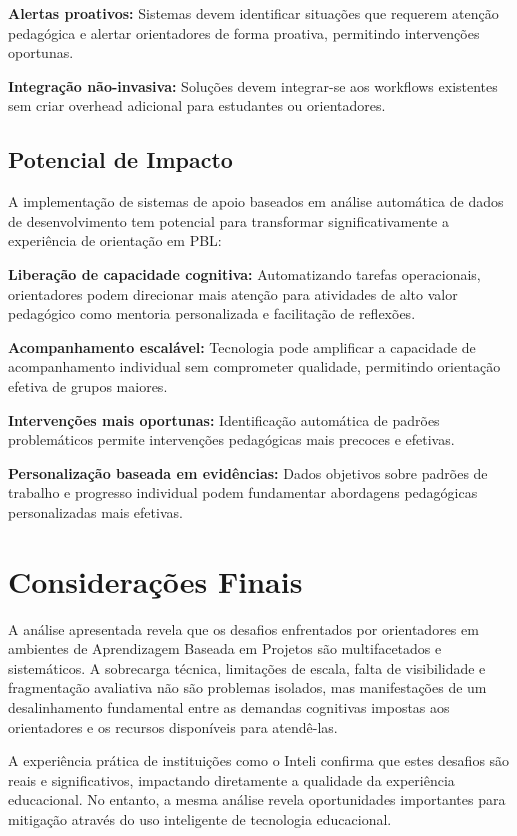 \documentclass[english, spanish, brazilian]{RBIEarticle} %
\begin{document}
\textbf{Alertas proativos:} Sistemas devem identificar situações que requerem atenção pedagógica e alertar orientadores de forma proativa, permitindo intervenções oportunas.

\textbf{Integração não-invasiva:} Soluções devem integrar-se aos workflows existentes sem criar overhead adicional para estudantes ou orientadores.

\subsection{Potencial de Impacto}

A implementação de sistemas de apoio baseados em análise automática de dados de desenvolvimento tem potencial para transformar significativamente a experiência de orientação em PBL:

\textbf{Liberação de capacidade cognitiva:} Automatizando tarefas operacionais, orientadores podem direcionar mais atenção para atividades de alto valor pedagógico como mentoria personalizada e facilitação de reflexões.

\textbf{Acompanhamento escalável:} Tecnologia pode amplificar a capacidade de acompanhamento individual sem comprometer qualidade, permitindo orientação efetiva de grupos maiores.

\textbf{Intervenções mais oportunas:} Identificação automática de padrões problemáticos permite intervenções pedagógicas mais precoces e efetivas.

\textbf{Personalização baseada em evidências:} Dados objetivos sobre padrões de trabalho e progresso individual podem fundamentar abordagens pedagógicas personalizadas mais efetivas.

\section{Considerações Finais}

A análise apresentada revela que os desafios enfrentados por orientadores em ambientes de Aprendizagem Baseada em Projetos são multifacetados e sistemáticos. A sobrecarga técnica, limitações de escala, falta de visibilidade e fragmentação avaliativa não são problemas isolados, mas manifestações de um desalinhamento fundamental entre as demandas cognitivas impostas aos orientadores e os recursos disponíveis para atendê-las.

A experiência prática de instituições como o Inteli confirma que estes desafios são reais e significativos, impactando diretamente a qualidade da experiência educacional. No entanto, a mesma análise revela oportunidades importantes para mitigação através do uso inteligente de tecnologia educacional.
\end{document}
